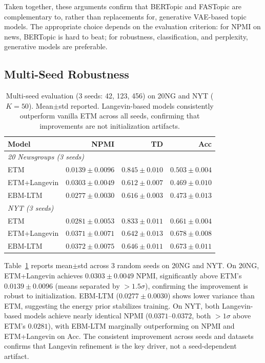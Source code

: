 \documentclass[10pt]{article}
\begin{document}
Taken together, these arguments confirm that BERTopic and FASTopic are complementary
to, rather than replacements for, generative VAE-based topic models. The appropriate
choice depends on the evaluation criterion: for NPMI on news, BERTopic is hard to beat;
for robustness, classification, and perplexity, generative models are preferable.

\subsection{Multi-Seed Robustness}
\label{sec:multiseed}

\begin{table}[t]
\centering
\caption{Multi-seed evaluation (3 seeds: 42, 123, 456) on 20NG and NYT ($K=50$).
Mean$\pm$std reported. Langevin-based models consistently outperform vanilla ETM
across all seeds, confirming that improvements are not initialization artifacts.}
\label{tab:multiseed}
\small
\begin{tabular}{lrrr}
\hline
\textbf{Model} & \textbf{NPMI} & \textbf{TD} & \textbf{Acc} \\
\hline
\multicolumn{4}{l}{\textit{20 Newsgroups (3 seeds)}} \\
ETM           & $0.0139 \pm 0.0096$ & $0.845 \pm 0.010$ & $0.503 \pm 0.004$ \\
ETM+Langevin  & $\mathbf{0.0303 \pm 0.0049}$ & $0.612 \pm 0.007$ & $0.469 \pm 0.010$ \\
EBM-LTM       & $0.0277 \pm 0.0030$ & $0.616 \pm 0.003$ & $0.473 \pm 0.013$ \\
\hline
\multicolumn{4}{l}{\textit{NYT (3 seeds)}} \\
ETM           & $0.0281 \pm 0.0053$ & $0.833 \pm 0.011$ & $0.661 \pm 0.004$ \\
ETM+Langevin  & $0.0371 \pm 0.0071$ & $0.642 \pm 0.013$ & $\mathbf{0.678 \pm 0.008}$ \\
EBM-LTM       & $\mathbf{0.0372 \pm 0.0075}$ & $0.646 \pm 0.011$ & $0.673 \pm 0.011$ \\
\hline
\end{tabular}
\end{table}

Table~\ref{tab:multiseed} reports mean$\pm$std across 3 random seeds on 20NG and NYT.
On 20NG, ETM+Langevin achieves $0.0303 \pm 0.0049$ NPMI, significantly above ETM's
$0.0139 \pm 0.0096$ (means separated by $> 1.5\sigma$), confirming the improvement
is robust to initialization. EBM-LTM ($0.0277 \pm 0.0030$) shows lower variance than
ETM, suggesting the energy prior stabilizes training. On NYT, both Langevin-based models
achieve nearly identical NPMI ($0.0371$--$0.0372$, both $> 1\sigma$ above ETM's
$0.0281$), with EBM-LTM marginally outperforming on NPMI and ETM+Langevin on Acc.
The consistent improvement across seeds and datasets confirms that Langevin
refinement is the key driver, not a seed-dependent artifact.
\end{document}
